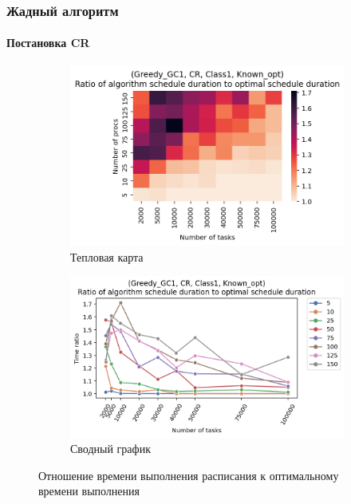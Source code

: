 \subsubsection{Жадный алгоритм}

\paragraph{Постановка CR}

\begin{figure}[!htbp]
    \centering
    \begin{subfigure}{0.49\textwidth}
        \includegraphics[width=\textwidth]{imgs/ideal_1/CR/th.png}
        \caption{Тепловая карта}
        \label{fig:CR-GC1-times-heatmap}
    \end{subfigure}
    \hfill
    \begin{subfigure}{0.49\textwidth}
        \includegraphics[width=\textwidth]{imgs/ideal_1/CR/gr_amalgamated.png}
        \caption{Сводный график}   
        \label{fig:CR-GC1-times-compiled} 
    \end{subfigure}
    \caption{Отношение времени выполнения расписания к оптимальному времени выполнения}
\end{figure}

